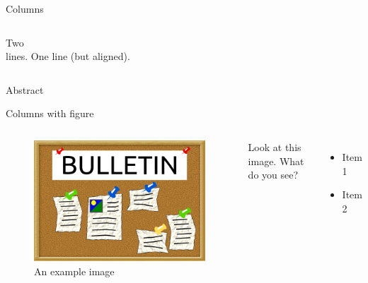 \begin{frame}{Columns}
  \begin{columns}
    \column[t]{5cm}
      Two\\lines.
    \column[t]{5cm}
      One line (but aligned).
  \end{columns}
\end{frame}


\begin{frame}{Abstract}
  \begin{abstract}
    This is the abstract
  \end{abstract}
\end{frame}

\begin{frame}{Columns with figure}
  \begin{columns}
      \begin{figure}
        \includegraphics[width=\textwidth]{example.png}
        \caption[my caption]{An example image}
      \end{figure}
      Look at this image. What do you see?
      \begin{itemize}
       \item Item 1
       \item Item 2
      \end{itemize}
  \end{columns}
\end{frame}


